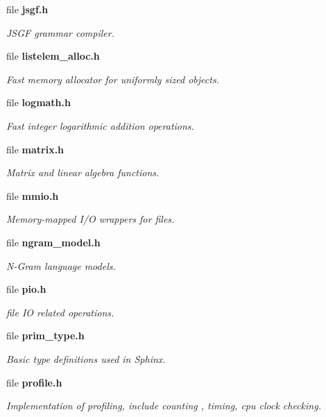 \begin{DoxyCompactItemize}
file \textbf{ jsgf.\+h}
\begin{DoxyCompactList}\small\item\em J\+S\+GF grammar compiler. \end{DoxyCompactList}\item 
file \textbf{ listelem\+\_\+alloc.\+h}
\begin{DoxyCompactList}\small\item\em Fast memory allocator for uniformly sized objects. \end{DoxyCompactList}\item 
file \textbf{ logmath.\+h}
\begin{DoxyCompactList}\small\item\em Fast integer logarithmic addition operations. \end{DoxyCompactList}\item 
file \textbf{ matrix.\+h}
\begin{DoxyCompactList}\small\item\em Matrix and linear algebra functions. \end{DoxyCompactList}\item 
file \textbf{ mmio.\+h}
\begin{DoxyCompactList}\small\item\em Memory-\/mapped I/O wrappers for files. \end{DoxyCompactList}\item 
file \textbf{ ngram\+\_\+model.\+h}
\begin{DoxyCompactList}\small\item\em N-\/\+Gram language models. \end{DoxyCompactList}\item 
file \textbf{ pio.\+h}
\begin{DoxyCompactList}\small\item\em file IO related operations. \end{DoxyCompactList}\item 
file \textbf{ prim\+\_\+type.\+h}
\begin{DoxyCompactList}\small\item\em Basic type definitions used in Sphinx. \end{DoxyCompactList}\item 
file \textbf{ profile.\+h}
\begin{DoxyCompactList}\small\item\em Implementation of profiling, include counting , timing, cpu clock checking. \end{DoxyCompactList}\item 

\end{DoxyCompactItemize}
